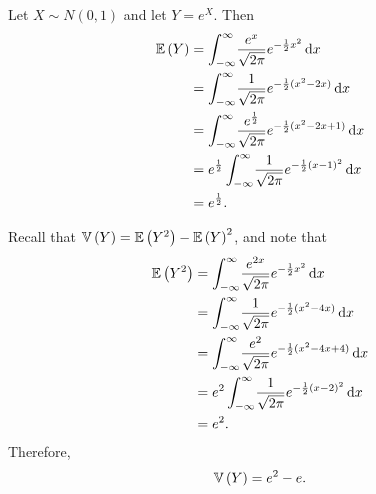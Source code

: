 \begin{ex}
  Let $X\sim N(0, 1)$ and let $Y=e^X$. Then
  \begin{align*}
    \mathbb{E}\left(Y\right)
     & =\int_{-\infty}^\infty\!\frac{e^x}{\sqrt{2\pi}}e^{-\frac{1}{2}x^2}\,\mathrm{d}{x}                    \\
     & =\int_{-\infty}^\infty\!\frac{1}{\sqrt{2\pi}}e^{-\frac{1}{2}(x^2-2x)}\,\mathrm{d}{x}                 \\
     & =\int_{-\infty}^\infty\!\frac{e^{\frac{1}{2}}}{\sqrt{2\pi}}e^{-\frac{1}{2}(x^2-2x+1)}\,\mathrm{d}{x} \\
     & =e^{\frac{1}{2}}\int_{-\infty}^\infty\!\frac{1}{\sqrt{2\pi}}e^{-\frac{1}{2}(x-1)^2}\,\mathrm{d}{x}   \\
     & =e^{\frac{1}{2}}.
  \end{align*}

  Recall that $\mathbb{V}\left(Y\right)=\mathbb{E}\left(Y^2\right)-\mathbb{E}\left(Y\right)^2$, and note that
  \begin{align*}
    \mathbb{E}\left(Y^2\right)
     & =\int_{-\infty}^\infty\!\frac{e^{2x}}{\sqrt{2\pi}}e^{-\frac{1}{2}x^2}\,\mathrm{d}{x}     \\
     & =\int_{-\infty}^\infty\!\frac{1}{\sqrt{2\pi}}e^{-\frac{1}{2}(x^2-4x)}\,\mathrm{d}{x}     \\
     & =\int_{-\infty}^\infty\!\frac{e^2}{\sqrt{2\pi}}e^{-\frac{1}{2}(x^2-4x+4)}\,\mathrm{d}{x} \\
     & =e^2\int_{-\infty}^\infty\!\frac{1}{\sqrt{2\pi}}e^{-\frac{1}{2}(x-2)^2}\,\mathrm{d}{x}   \\
     & =e^2.
  \end{align*}
  Therefore,
  \[
    \mathbb{V}\left(Y\right)=e^2-e.
  \]
\end{ex}

